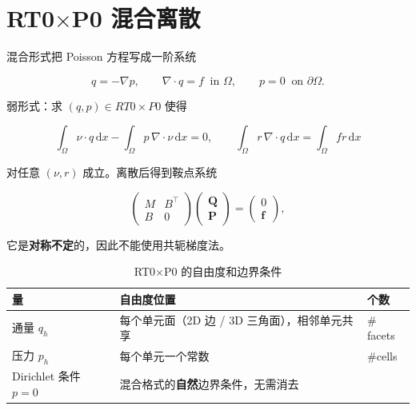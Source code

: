 \documentclass[UTF8,11pt,oneside]{ctexbook}
\theoremstyle{definition}
\theoremstyle{plain}
\newcommand{\dif}{\,\mathrm{d}}
\begin{document}
\section{RT0$\times$P0 混合离散}

混合形式把 Poisson 方程写成一阶系统

\begin{equation}
q=-\nabla p,\qquad \nabla\cdot q=f\ \text{ in }\Omega,\qquad
p=0\ \text{ on }\partial\Omega .
\label{eq:mixed}
\end{equation}

弱形式：求 $(q,p)\in RT0\times P0$ 使得

\begin{equation}
\int_\Omega \nu\cdot q\dif x-\int_\Omega p\,\nabla\cdot\nu\dif x=0,
\qquad
\int_\Omega r\,\nabla\cdot q\dif x=\int_\Omega f r\dif x
\label{eq:mixed-weak}
\end{equation}

对任意 $(\nu,r)$ 成立。离散后得到鞍点系统

\begin{equation}
\begin{pmatrix} M & B^{\top}\\ B & 0\end{pmatrix}
\begin{pmatrix} \mathbf{Q}\\ \mathbf{P}\end{pmatrix}
=\begin{pmatrix} 0\\ \mathbf{f}\end{pmatrix},
\label{eq:saddle}
\end{equation}

它是\textbf{对称不定}的，因此不能使用共轭梯度法。

\begin{table}[htbp]
\centering
\caption{RT0$\times$P0 的自由度和边界条件}
\label{tab:rt0}
\begin{lrbox}{\guideTableBox}
\begin{tabular}{@{}lll@{}}
\toprule
量 & 自由度位置 & 个数 \\
\midrule
通量 $q_h$ & 每个单元面（2D 边 / 3D 三角面），相邻单元共享 & $\#$facets \\
压力 $p_h$ & 每个单元一个常数 & $\#$cells \\
\midrule
Dirichlet 条件 $p=0$ & \multicolumn{2}{l}{混合格式的\textbf{自然}边界条件，无需消去} \\
\bottomrule
\end{tabular}
\end{lrbox}%
\ifdim\wd\guideTableBox>\linewidth
  \resizebox{\linewidth}{!}{\usebox{\guideTableBox}}%
\else\usebox{\guideTableBox}\fi
\end{table}
\end{document}
